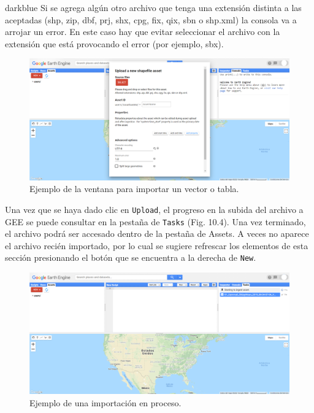 \documentclass[
  12pt,
  letterpaper,
  twoside]{book}
\begin{document}
\begin{bluebox2}

\begin{awesomeblock}{5pt}{\faLightbulb}{darkblue}
Si se agrega algún otro archivo que tenga una extensión distinta a las aceptadas (shp, zip, dbf, prj, shx, cpg, fix, qix, sbn o shp.xml) la consola va a arrojar un error. En este caso hay que evitar seleccionar el archivo con la extensión que está provocando el error (por ejemplo, sbx).

\end{awesomeblock}

\end{bluebox2}

\begin{figure}[btp]

{\centering \includegraphics[width=1\linewidth]{Img/Asset2} 

}

\caption{Ejemplo de la ventana para importar un vector o tabla.}\label{fig:unnamed-chunk-173}
\end{figure}

Una vez que se haya dado clic en \texttt{Upload}, el progreso en la subida del archivo a GEE se puede consultar en la pestaña de \texttt{Tasks} (Fig. 10.4). Una vez terminado, el archivo podrá ser accesado dentro de la pestaña de Assets. A veces no aparece el archivo recién importado, por lo cual se sugiere refrescar los elementos de esta sección presionando el botón que se encuentra a la derecha de \texttt{New}.

\begin{figure}[btp]

{\centering \includegraphics[width=1\linewidth]{Img/Asset3} 

}

\caption{Ejemplo de una importación en proceso.}\label{fig:unnamed-chunk-174}
\end{figure}
\end{document}
